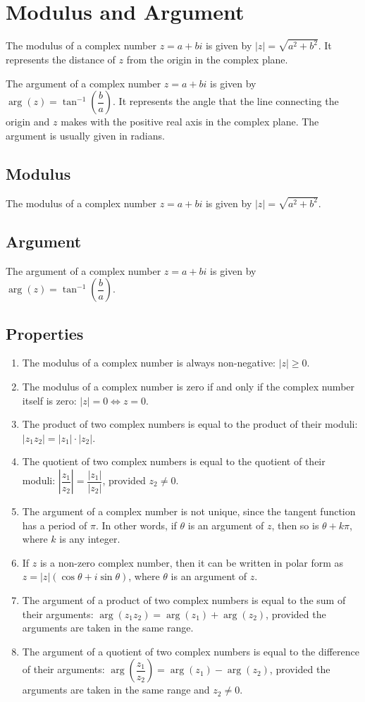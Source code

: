 \documentclass{article}
\begin{document}
\section{Modulus and Argument}
The modulus of a complex number $z = a + bi$ is given by $|z| = \sqrt{a^2 +
b^2}$. It represents the distance of $z$ from the origin in the complex plane.

The argument of a complex number $z = a + bi$ is given by $\arg(z) =
\tan^{-1}\left(\dfrac{b}{a}\right)$. It represents the angle that the line
connecting the origin and $z$ makes with the positive real axis in the complex
plane. The argument is usually given in radians.

\subsection{Modulus}
The modulus of a complex number $z = a + bi$ is given by $|z| = \sqrt{a^2 + b^2}$.

\subsection{Argument}
The argument of a complex number $z = a + bi$ is given by $\arg(z) =
\tan^{-1}\left(\dfrac{b}{a}\right)$.

\subsection{Properties}
\begin{enumerate}
    \item The modulus of a complex number is always non-negative: $|z| \geq 0$.
    \item The modulus of a complex number is zero if and only if the complex number itself is zero: $|z| = 0 \iff z = 0$.
    \item The product of two complex numbers is equal to the product of their moduli: $|z_1 z_2| = |z_1| \cdot |z_2|$.
    \item The quotient of two complex numbers is equal to the quotient of their moduli: $\left|\dfrac{z_1}{z_2}\right| = \dfrac{|z_1|}{|z_2|}$, provided $z_2 \neq 0$.
    \item The argument of a complex number is not unique, since the tangent function has a period of $\pi$. In other words, if $\theta$ is an argument of $z$, then so is $\theta + k\pi$, where $k$ is any integer.
    \item If $z$ is a non-zero complex number, then it can be written in polar form as $z = |z|(\cos \theta + i\sin \theta)$, where $\theta$ is an argument of $z$.
    \item The argument of a product of two complex numbers is equal to the sum of their arguments: $\arg(z_1 z_2) = \arg(z_1) + \arg(z_2)$, provided the arguments are taken in the same range.
    \item The argument of a quotient of two complex numbers is equal to the difference of their arguments: $\arg\left(\dfrac{z_1}{z_2}\right) = \arg(z_1) - \arg(z_2)$, provided the arguments are taken in the same range and $z_2 \neq 0$.
\end{enumerate}
\end{document}
